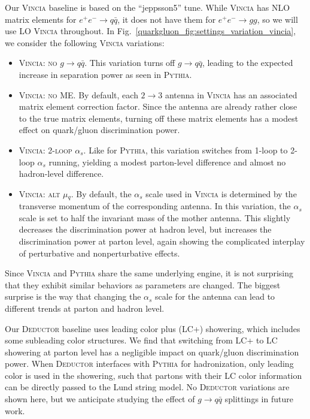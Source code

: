 \documentclass[11pt]{cernrep}
\begin{document}
Our \textsc{Vincia} baseline is based on the ``jeppsson5'' tune.  While \textsc{Vincia} has NLO matrix elements for $e^+ e^- \to q \bar{q}$, it does not have them for $e^+ e^- \to gg$, so we will use LO \textsc{Vincia} throughout.  In Fig.~\ref{quarkgluon_fig:settings_variation_vincia}, we consider the following \textsc{Vincia} variations:
\begin{itemize}
\item \textsc{Vincia:  no $g \to q\bar{q}$}.  This variation turns off $g \to q \bar{q}$, leading to the expected increase in separation power as seen in \textsc{Pythia}.
\item \textsc{Vincia: no ME}.  By default, each $2 \to 3$ antenna in \textsc{Vincia} has an associated matrix element correction factor.  Since the antenna are already rather close to the true matrix elements, turning off these matrix elements has a modest effect on quark/gluon discrimination power.
\item \textsc{Vincia: 2-loop $\alpha_s$}.  Like for \textsc{Pythia}, this variation switches from 1-loop to 2-loop $\alpha_s$ running, yielding a modest parton-level difference and almost no hadron-level difference. 
\item \textsc{Vincia: alt $\mu_q$}.  By default, the $\alpha_s$ scale used in \textsc{Vincia} is determined by the transverse momentum of the corresponding antenna.  In this variation, the $\alpha_s$ scale is set to half the invariant mass of the mother antenna.  This slightly decreases the discrimination power at hadron level, but increases the discrimination power at parton level, again showing the complicated interplay of perturbative and nonperturbative effects.
\end{itemize}
Since \textsc{Vincia} and \textsc{Pythia} share the same underlying engine, it is not surprising that they exhibit similar behaviors as parameters are changed.  The biggest surprise is the way that changing the $\alpha_s$ scale for the antenna can lead to different trends at parton and hadron level.

Our \textsc{Deductor} baseline uses leading color plus (LC+) showering, which includes some subleading color structures. We find that switching from LC+ to LC showering at parton level has a negligible impact on quark/gluon discrimination power.  When \textsc{Deductor} interfaces with \textsc{Pythia} for hadronization, only leading color is used in the showering, such that partons with their LC color information can be directly passed to the Lund string model.  No  \textsc{Deductor} variations are shown here, but we anticipate studying the effect of $g \to q \bar{q}$ splittings in future work.
\end{document}

